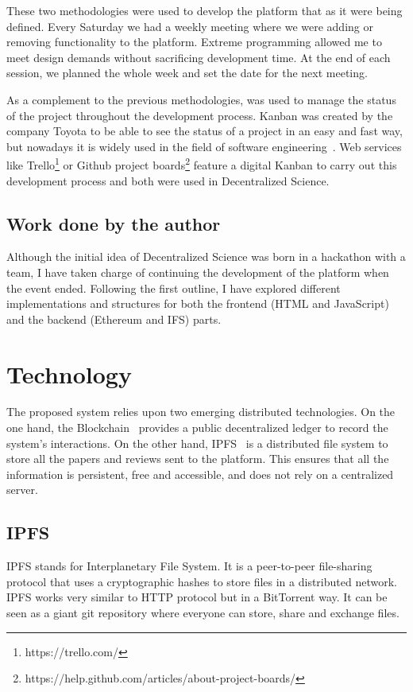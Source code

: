 These two methodologies were used to develop the platform that as it were being
defined. Every Saturday we had a weekly meeting where we were adding or removing
functionality to the platform. Extreme programming allowed me to meet design
demands without sacrificing development time. At the end of each session, we
planned the whole week and set the date for the next meeting.

As a complement to the previous methodologies,  was used to manage
the status of the project throughout the development process. Kanban was created
by the company Toyota to be able to see the status of a project in an easy and
fast way, but nowadays it is widely used in the field of software
engineering~\cite{ahmad2013kanban}. Web services like
Trello\footnote{https://trello.com/} or Github project
boards\footnote{https://help.github.com/articles/about-project-boards/} feature
a digital Kanban to carry out this development process and both were used in
Decentralized Science.

\subsection{Work done by the author}

Although the initial idea of Decentralized Science was born in a hackathon with
a team, I have taken charge of continuing the development of the platform when
the event ended. Following the first outline, I have explored different
implementations and structures for both the frontend (HTML and JavaScript) and
the backend (Ethereum and IFS) parts.

\section{Technology}
\label{tech}

The proposed system relies upon two emerging distributed technologies. On the
one hand, the Blockchain~\cite{buterin2014ethereum} provides a public
decentralized ledger to record the system's interactions. On the other hand,
IPFS~\cite{benet_ipfs-content_2014} is a distributed file system to store all
the papers and reviews sent to the platform. This ensures that all the
information is persistent, free and accessible, and does not rely on a
centralized server.

\subsection{IPFS}
\label{tech:sec:ipfs}
IPFS stands for Interplanetary File System. It is a peer-to-peer file-sharing
protocol that uses a cryptographic hashes to store files in a distributed
network. IPFS works very similar to HTTP protocol but in a BitTorrent way. It
can be seen as a giant git repository where everyone can store, share and
exchange files\cite{benet2014ipfs}.


